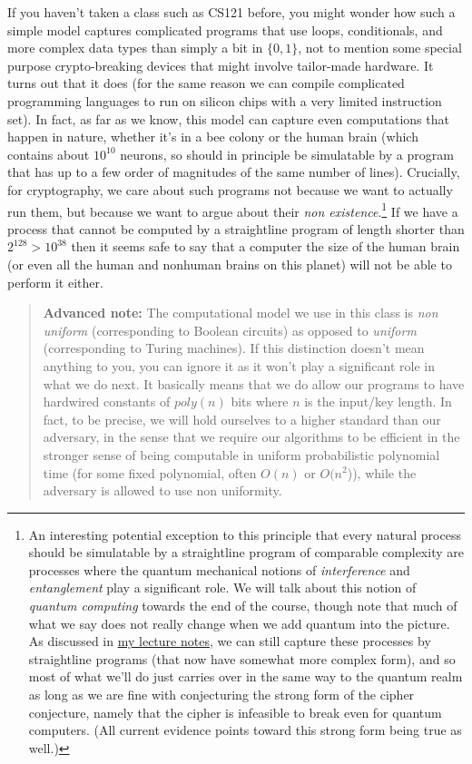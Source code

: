If you haven't taken a class such as CS121 before, you might wonder how
such a simple model captures complicated programs that use loops,
conditionals, and more complex data types than simply a bit in
\(\{0,1\}\), not to mention some special purpose crypto-breaking devices
that might involve tailor-made hardware. It turns out that it does (for
the same reason we can compile complicated programming languages to run
on silicon chips with a very limited instruction set). In fact, as far
as we know, this model can capture even computations that happen in
nature, whether it's in a bee colony or the human brain (which contains
about \(10^{10}\) neurons, so should in principle be simulatable by a
program that has up to a few order of magnitudes of the same number of
lines). Crucially, for cryptography, we care about such programs not
because we want to actually run them, but because we want to argue about
their \emph{non existence}.\footnote{An interesting potential exception
  to this principle that every natural process should be simulatable by
  a straightline program of comparable complexity are processes where
  the quantum mechanical notions of \emph{interference} and
  \emph{entanglement} play a significant role. We will talk about this
  notion of \emph{quantum computing} towards the end of the course,
  though note that much of what we say does not really change when we
  add quantum into the picture. As discussed in
  \href{http://introtcs.org}{my lecture notes}, we can still capture
  these processes by straightline programs (that now have somewhat more
  complex form), and so most of what we'll do just carries over in the
  same way to the quantum realm as long as we are fine with conjecturing
  the strong form of the cipher conjecture, namely that the cipher is
  infeasible to break even for quantum computers. (All current evidence
  points toward this strong form being true as well.)} If we have a
process that cannot be computed by a straightline program of length
shorter than \(2^{128}>10^{38}\) then it seems safe to say that a
computer the size of the human brain (or even all the human and nonhuman
brains on this planet) will not be able to perform it either.

\begin{quote}
\textbf{Advanced note:} The computational model we use in this class is
\emph{non uniform} (corresponding to Boolean circuits) as opposed to
\emph{uniform} (corresponding to Turing machines). If this distinction
doesn't mean anything to you, you can ignore it as it won't play a
significant role in what we do next. It basically means that we do allow
our programs to have hardwired constants of \(poly(n)\) bits where \(n\)
is the input/key length. In fact, to be precise, we will hold ourselves
to a higher standard than our adversary, in the sense that we require
our algorithms to be efficient in the stronger sense of being computable
in uniform probabilistic polynomial time (for some fixed polynomial,
often \(O(n)\) or \(O(n^2\))), while the adversary is allowed to use non
uniformity.
\end{quote}

